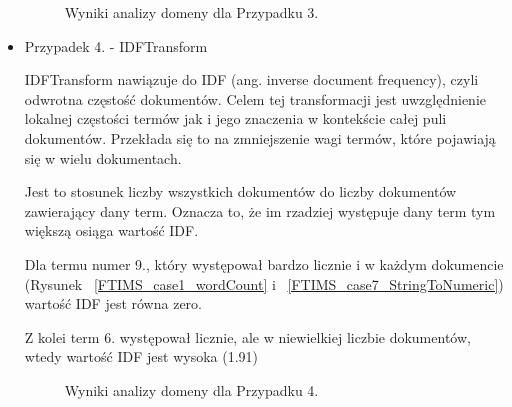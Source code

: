 \documentclass{classrep}
\begin{document}
\begin{itemize}
   
    \begin{figure}[H] 
    	\begin{center}
        \caption{Wyniki analizy domeny dla Przypadku 3.}
        \label{FTIMS_case3_TFT}
    	\end{center}
    \end{figure}


     \item  Przypadek 4. - IDFTransform
        
    IDFTransform nawiązuje do IDF (ang. inverse document frequency), czyli odwrotna częstość dokumentów. Celem tej transformacji jest uwzględnienie lokalnej częstości termów jak i jego znaczenia w kontekście całej puli dokumentów. Przekłada się to na zmniejszenie wagi termów, które pojawiają się w wielu dokumentach. 
    
    Jest to stosunek liczby wszystkich dokumentów do liczby dokumentów zawierający dany term. Oznacza to, że im rzadziej występuje dany term tym większą osiąga wartość IDF.
    
    \begin{table}[H]
    \centering
    \caption{Parametry zastosowanego filtra StringToWordVector dla przypadku 4.}
    \label{tab:apriori_num_params}
    \end{table}
    
    Dla termu numer 9., który występował bardzo licznie i w każdym dokumencie (Rysunek ~\ref{FTIMS_case1_wordCount} i ~\ref{FTIMS_case7_StringToNumeric}) wartość IDF jest równa zero.
    
    Z kolei term 6. występował licznie, ale w niewielkiej liczbie dokumentów, wtedy wartość IDF jest wysoka (1.91)
   
    \begin{figure}[H] 
    	\begin{center}
        \caption{Wyniki analizy domeny dla Przypadku 4.}
    	\end{center}
    \end{figure}




\end{itemize}
\end{document}

